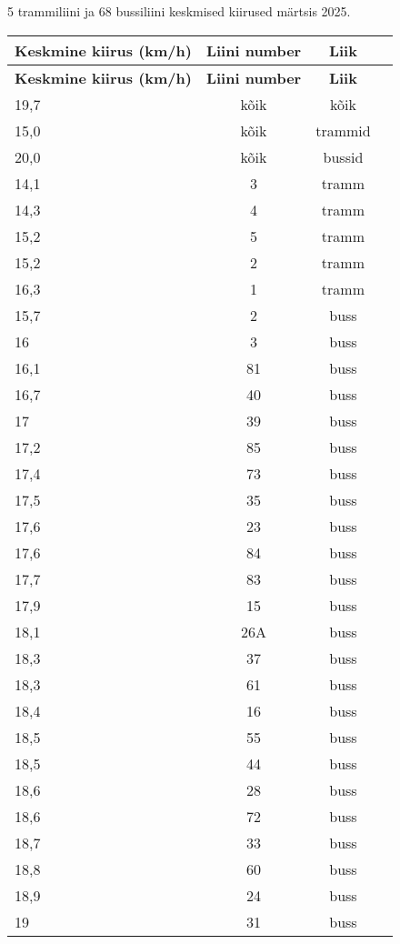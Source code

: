 
5 trammiliini ja  68 bussiliini keskmised kiirused märtsis 2025.

\begin{longtable}{|l|c|c|c|} \hline
 \textbf{Keskmine kiirus (km/h)}  & \textbf{Liini number}  & \textbf{Liik} \\
\hline
\endfirsthead
\hline
\textbf{Keskmine kiirus (km/h)} & 
\textbf{Liini number} & \textbf{Liik} \\
\hline
\endhead
19,7 & kõik & kõik\\ \hline
15,0 & kõik & trammid\\ \hline
20,0 & kõik & bussid\\ \hline
14,1	&	3	&	tramm	\\ \hline
14,3	&	4	&	tramm	\\ \hline 
15,2	&	5	&	tramm	\\ \hline
15,2	&	2	&	tramm	\\ \hline
16,3	&	1	&	tramm	\\ \hline
15,7	&	2	&	buss	\\ \hline
16	&	3	&	buss	\\ \hline
16,1	&	81	&	buss	\\ \hline
16,7	&	40	&	buss	\\ \hline
17	&	39	&	buss	\\ \hline
17,2	&	85	&	buss	\\ \hline
17,4	&	73	&	buss	\\ \hline
17,5	&	35	&	buss	\\ \hline
17,6	&	23	&	buss	\\ \hline
17,6	&	84	&	buss	\\ \hline
17,7	&	83	&	buss	\\ \hline
17,9	&	15	&	buss	\\ \hline
18,1	&	26A	&	buss	\\ \hline
18,3	&	37	&	buss	\\ \hline
18,3	&	61	&	buss	\\ \hline
18,4	&	16	&	buss	\\ \hline
18,5	&	55	&	buss	\\ \hline
18,5	&	44	&	buss	\\ \hline
18,6	&	28	&	buss	\\ \hline
18,6	&	72	&	buss	\\ \hline
18,7	&	33	&	buss	\\ \hline
18,8	&	60	&	buss	\\ \hline
18,9	&	24	&	buss	\\ \hline
19	&	31	&	buss	\\ \hline

\end{longtable}
